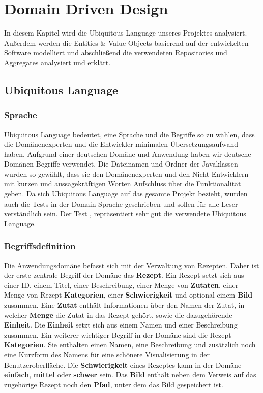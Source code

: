 \chapter{Domain Driven Design}
In diesem Kapitel wird die Ubiquitous Language unseres Projektes analysiert. Außerdem werden die Entities \& Value Objects basierend auf der entwickelten Software modelliert und abschließend die verwendeten Repositories und Aggregates analysiert und erklärt.
\section{Ubiquitous Language}
\subsection{Sprache}
Ubiquitous Language  bedeutet, eine Sprache und die Begriffe so zu wählen, dass die Domänenexperten und die Entwickler minimalen Übersetzungsaufwand haben.  Aufgrund einer deutschen Domäne und Anwendung haben wir deutsche Domänen Begriffe verwendet.
Die Dateinamen und Ordner der Javaklassen wurden so gewählt, dass sie den Domänenexperten und den Nicht-Entwicklern mit kurzen und aussagekräftigen Worten Aufschluss über die Funktionalität geben.
Da sich Ubiquitous Language  auf das gesamte Projekt bezieht, wurden auch die Tests in der Domain Sprache geschrieben und sollen für alle Leser verständlich sein. Der Test \href{https://github.com/MichaelaHaag/RezeptApp/blob/main/3-Domain-Code/src/test/java/de/rezeptapp/domain/Rezept/RezeptRepositoryTest.java}{}, repräsentiert sehr gut die verwendete Ubiquitous Language.
\subsection{Begriffsdefinition}
Die Anwendungsdomäne befasst sich mit der Verwaltung von Rezepten. Daher ist der erste zentrale Begriff der Domäne das \textbf{Rezept}. Ein Rezept setzt sich aus einer ID, einem Titel, einer Beschreibung, einer Menge von \textbf{Zutaten}, einer Menge von Rezept \textbf{Kategorien}, einer \textbf{Schwierigkeit} und optional einem \textbf{Bild} zusammen. Eine \textbf{Zutat} enthält Informationen über den Namen der Zutat, in welcher \textbf{Menge} die Zutat in das Rezept gehört, sowie die dazugehörende \textbf{Einheit}. Die \textbf{Einheit} setzt sich aus einem Namen und einer Beschreibung zusammen.
Ein weiterer wichtiger Begriff in der Domäne sind die Rezept-\textbf{Kategorien}. Sie enthalten einen Namen, eine Beschreibung und zusätzlich noch eine Kurzform des Namens für eine schönere Visualisierung in der Benutzeroberfläche.
Die \textbf{Schwierigkeit} eines Rezeptes kann in der Domäne \textbf{einfach}, \textbf{mittel} oder \textbf{schwer} sein. Das \textbf{Bild} enthält neben dem Verweis auf das zugehörige Rezept noch den \textbf{Pfad}, unter dem das Bild gespeichert ist.
